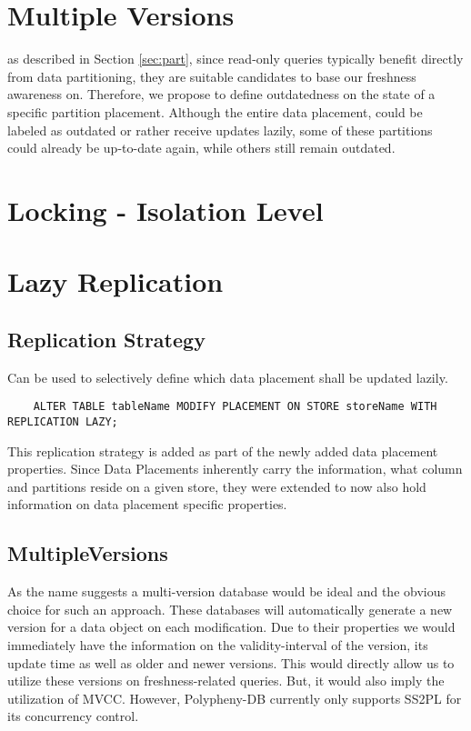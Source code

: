 \section{Multiple Versions}

as described in Section \ref{sec:part}, since read-only queries typically benefit directly from data partitioning, they are suitable candidates to base our freshness awareness on.
Therefore, we propose to define outdatedness on the state of a specific partition placement.
Although the entire data placement, could be labeled as outdated or rather receive updates lazily, some of 
these partitions could already be up-to-date again, while others still remain outdated.




\section{Locking - Isolation Level}




\section{Lazy Replication}

\subsection{Replication Strategy}
Can be used to selectively define which data placement shall be updated lazily.
\begin{verbatim}
    ALTER TABLE tableName MODIFY PLACEMENT ON STORE storeName WITH REPLICATION LAZY;
\end{verbatim}

This replication strategy is added as part of the newly added data placement properties. Since Data Placements inherently carry the information, what column and partitions reside
on a given store, they were extended to now also hold information on data placement specific properties.


\subsection{MultipleVersions}
As the name suggests a multi-version database would be ideal and the obvious choice for such an approach.
These databases will automatically generate a new version for a data object on each modification.
Due to their properties we would immediately have the information on the validity-interval of the version, its update time as well as older and newer versions.
This would directly allow us to utilize these versions on freshness-related queries. But, it would also imply the utilization of MVCC.
However, Polypheny-DB currently only supports SS2PL for its concurrency control. 

